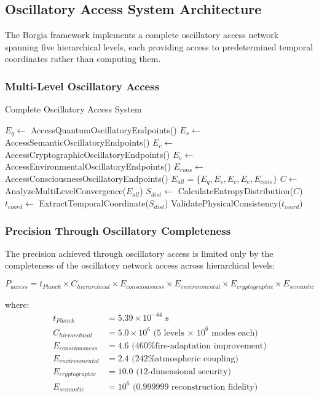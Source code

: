 \documentclass[11pt,a4paper]{article}
\begin{document}
\subsection{Oscillatory Access System Architecture}

The Borgia framework implements a complete oscillatory access network spanning five hierarchical levels, each providing access to predetermined temporal coordinates rather than computing them.

\subsubsection{Multi-Level Oscillatory Access}

\begin{algorithm}
\caption{Complete Oscillatory Access System}
\begin{algorithmic}
    \State $E_q \leftarrow$ AccessQuantumOscillatoryEndpoints()
    \State $E_s \leftarrow$ AccessSemanticOscillatoryEndpoints() 
    \State $E_c \leftarrow$ AccessCryptographicOscillatoryEndpoints()
    \State $E_e \leftarrow$ AccessEnvironmentalOscillatoryEndpoints()
    \State $E_{cons} \leftarrow$ AccessConsciousnessOscillatoryEndpoints()
    \State $E_{all} = \{E_q, E_s, E_c, E_e, E_{cons}\}$
    \State $C \leftarrow$ AnalyzeMultiLevelConvergence($E_{all}$)
    \State $S_{dist} \leftarrow$ CalculateEntropyDistribution($C$)
    \State $t_{coord} \leftarrow$ ExtractTemporalCoordinate($S_{dist}$)
    \State \Return ValidatePhysicalConsistency($t_{coord}$)
\EndProcedure
\end{algorithmic}
\end{algorithm}

\subsubsection{Precision Through Oscillatory Completeness}

The precision achieved through oscillatory access is limited only by the completeness of the oscillatory network access across hierarchical levels:

\begin{equation}
P_{access} = t_{Planck} \times C_{hierarchical} \times E_{consciousness} \times E_{environmental} \times E_{cryptographic} \times E_{semantic}
\end{equation}

where:
\begin{align}
t_{Planck} &= 5.39 \times 10^{-44} \text{ s} \\
C_{hierarchical} &= 5.0 \times 10^6 \text{ (5 levels × 10}^6 \text{ modes each)} \\
E_{consciousness} &= 4.6 \text{ (460\% fire-adaptation improvement)} \\
E_{environmental} &= 2.4 \text{ (242\% atmospheric coupling)} \\
E_{cryptographic} &= 10.0 \text{ (12-dimensional security)} \\
E_{semantic} &= 10^6 \text{ (0.999999 reconstruction fidelity)}
\end{align}
\end{document}
